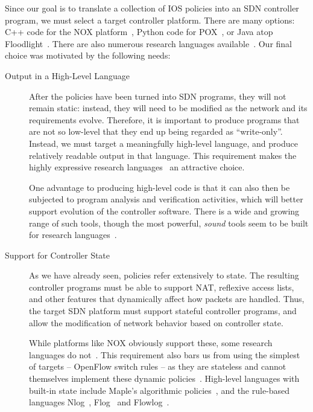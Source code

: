 Since our goal is to translate a collection of IOS policies into an SDN
controller program, we must select a target controller platform. There
are many options: C++ code for the NOX platform~\cite{Gude:2008},
Python code for POX~\cite{pox}, or Java atop Floodlight~\cite{floodlight}. There are also
numerous research languages
available~\cite{foster:icfp11-frenetic,katta:xldi12-flog,monsanto++:nsdi13-pyretic,Nelson:2014flowlog,Voellmy:2011,voellmy:hotsdn12-procera,Voellmy:2013}.
Our final choice was motivated by the
following needs:
\begin{description}

\item[Output in a High-Level Language] After the policies have been
  turned into SDN programs, they will not remain static: instead, they
  will need to be modified as the network and its requirements
  evolve. Therefore, it is important to produce programs that are not
  so low-level that they end up being regarded as
  ``write-only''. Instead, we must target a meaningfully high-level
  language, and produce relatively readable output in that
  language. This requirement makes the highly expressive research
  languages~\cite{foster:icfp11-frenetic,katta:xldi12-flog,koponen++:nsdi14-vmware-nlog,Nelson:2014flowlog,Voellmy:2013} an attractive choice.

  One advantage to producing high-level code is that it can also then
  be subjected to program analysis and verification activities, which
  will better support evolution of the controller software. There is a
  wide and growing range of such tools, though the most powerful,
  \emph{sound} tools seem to be built for research languages~\cite{guha:sdnverif,Nelson:2014flowlog}.

\item[Support for Controller State] As we have already seen, policies
  refer extensively to state.  The resulting controller programs must
  be able to support NAT, reflexive access lists, and other features
  that dynamically affect how packets are handled.  Thus, the target
  SDN platform must support stateful controller programs, and allow
  the modification of network behavior based on controller state.

  While platforms like NOX obviously support these, some research
  languages do not~\cite{monsanto:popl12-netcore,monsanto++:nsdi13-pyretic,Voellmy:2013}. This requirement also bars us from using
  the simplest of targets -- OpenFlow switch rules -- as they are
  stateless and cannot themselves implement these dynamic policies~\cite{McKeown:2008}.
  High-level languages with built-in state include Maple's algorithmic
  policies~\cite{Voellmy:2013}, and the rule-based languages Nlog~\cite{koponen++:nsdi14-vmware-nlog}, Flog~\cite{katta:xldi12-flog} and Flowlog~\cite{Nelson:2014flowlog}.


\end{description}
